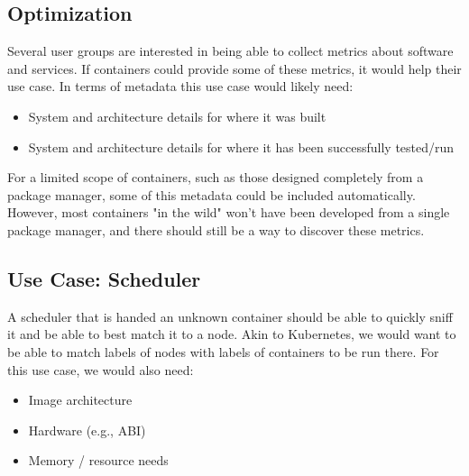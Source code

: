 \subsection{Optimization}

Several user groups are interested in being able to collect metrics about software and services. If containers could provide some of these metrics, it would help their use case.
In terms of metadata this use case would likely need:

\begin{itemize}
\item System and architecture details for where it was built
\item System and architecture details for where it has been successfully tested/run
\end{itemize}

For a limited scope of containers, such as those designed completely from a package manager, some of this metadata could be included automatically. However, most containers "in the wild" won't have been developed from a single package manager, and there should still be a way to discover these metrics.

\subsection{Use Case: Scheduler}

A scheduler that is handed an unknown container should be able to quickly sniff it and be able to best match it to a node. Akin to Kubernetes, we would want to be able to match labels of nodes with labels of containers to be run there. For this use case, we would also need:

\begin{itemize}
\item Image architecture
\item Hardware (e.g., ABI)
\item Memory / resource needs
\end{itemize}

